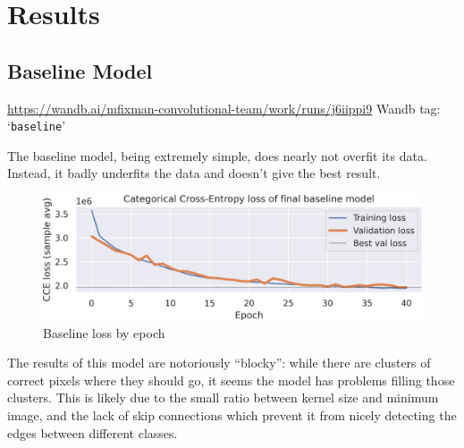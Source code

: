 \section{Results}

\subsection{Baseline Model}
\begin{scriptsize}
	\vspace{-\parskip}
	\url{https://wandb.ai/mfixman-convolutional-team/work/runs/j6iippi9}
	\hfill{} Wandb tag: `\texttt{baseline}'
\end{scriptsize}

The baseline model, being extremely simple, does nearly not overfit its data.
Instead, it badly underfits the data and doesn't give the best result.

\begin{figure}[h]
	\centering
	\includegraphics[width=.9\textwidth]{baseline_loss.png}
	\caption{Baseline loss by epoch}
\end{figure}

The results of this model are notoriously ``blocky'': while there are clusters of correct pixels where they should go, it seems the model has problems filling those clusters.
This is likely due to the small ratio between kernel size and minimum image, and the lack of skip connections which prevent it from nicely detecting the edges between different classes.

